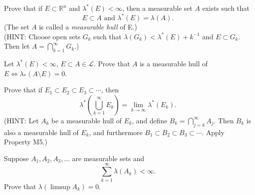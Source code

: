 \documentclass[answers]{exam}
\begin{document}
\begin{questions}
\begin{solution}
   \end{solution}
   \question
   Prove that if $E\subset \mathbb{R}^{n}$ and $\lambda^{*}\left(E\right)<\infty $, then a measurable set $A$ exists such that
   $$
   E \subset A \text{ and } \lambda^{*}\left(E\right) = \lambda\left(A\right).
   $$
   (The set $A$ is called a \emph{measurable hull} of E.)\\
   (HINT: Choose open sets $G_{k}$ such that $\lambda\left(G_{k}\right) < \lambda^{*}\left(E\right)+k^{-1}$ and $E \subset G_{k}$. Then let $A = \bigcap_{k=1}^{\infty}G_{k}$.)
   \begin{solution}

   \end{solution}
   \question
   Let $\lambda^{*}\left(E\right) < \infty$, $E \subset A \in \mathcal{L}$. Prove that $A$ is a measurable hull of $E \iff \lambda_{*}\left(A\setminus E\right) = 0$.
   \begin{solution}

   \end{solution}
   \question
   Prove that if $E_{1} \subset E_{2} \subset E_{3} \subset \cdots $, then
   $$
   \lambda^{*}\left(\bigcup_{k=1}^{\infty}E_{k} \right) = \lim_{k\to\infty}\lambda^{*}\left(E_{k}\right).
   $$
   (HINT: Let $A_{k}$ be a measurable hull of $E_{k}$, and define $B_{k}=\bigcap_{j=k}^{\infty}A_{j}$. Then $B_{k}$ is also a measurable hull of $E_{k}$, and furthermore $B_{1} \subset B_{2} \subset B_{3} \subset \cdots$. Apply Property M5.)
   \begin{solution}

   \end{solution}
   \question
   Suppose $A_{1}, A_{2}, A_{3}, \ldots$ are measurable sets and
   $$
   \sum_{k=1}^{\infty}\lambda\left(A_{k}\right) <\infty.
   $$
   Prove that $\lambda\left(\limsup A_{k}\right) = 0$.
   \begin{solution}

   \end{solution}
\end{questions}
\end{document}
